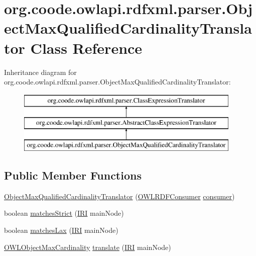 \hypertarget{classorg_1_1coode_1_1owlapi_1_1rdfxml_1_1parser_1_1_object_max_qualified_cardinality_translator}{\section{org.\-coode.\-owlapi.\-rdfxml.\-parser.\-Object\-Max\-Qualified\-Cardinality\-Translator Class Reference}
\label{classorg_1_1coode_1_1owlapi_1_1rdfxml_1_1parser_1_1_object_max_qualified_cardinality_translator}
}
Inheritance diagram for org.\-coode.\-owlapi.\-rdfxml.\-parser.\-Object\-Max\-Qualified\-Cardinality\-Translator\-:\begin{figure}[H]
\begin{center}
\leavevmode
\includegraphics[height=3.000000cm]{classorg_1_1coode_1_1owlapi_1_1rdfxml_1_1parser_1_1_object_max_qualified_cardinality_translator}
\end{center}
\end{figure}
\subsection*{Public Member Functions}
\begin{DoxyCompactItemize}
\item 
\hyperlink{classorg_1_1coode_1_1owlapi_1_1rdfxml_1_1parser_1_1_object_max_qualified_cardinality_translator_a48aa870676d975a3e3956262f1e94ecf}{Object\-Max\-Qualified\-Cardinality\-Translator} (\hyperlink{classorg_1_1coode_1_1owlapi_1_1rdfxml_1_1parser_1_1_o_w_l_r_d_f_consumer}{O\-W\-L\-R\-D\-F\-Consumer} \hyperlink{classorg_1_1coode_1_1owlapi_1_1rdfxml_1_1parser_1_1_abstract_class_expression_translator_ae547084cdd5b92c03835b5aa404f823b}{consumer})
\item 
boolean \hyperlink{classorg_1_1coode_1_1owlapi_1_1rdfxml_1_1parser_1_1_object_max_qualified_cardinality_translator_ad461aae70c653f295608a079ed0530b1}{matches\-Strict} (\hyperlink{classorg_1_1semanticweb_1_1owlapi_1_1model_1_1_i_r_i}{I\-R\-I} main\-Node)
\item 
boolean \hyperlink{classorg_1_1coode_1_1owlapi_1_1rdfxml_1_1parser_1_1_object_max_qualified_cardinality_translator_ab005d68d441c95647ca5c6f4d48e24a9}{matches\-Lax} (\hyperlink{classorg_1_1semanticweb_1_1owlapi_1_1model_1_1_i_r_i}{I\-R\-I} main\-Node)
\item 
\hyperlink{interfaceorg_1_1semanticweb_1_1owlapi_1_1model_1_1_o_w_l_object_max_cardinality}{O\-W\-L\-Object\-Max\-Cardinality} \hyperlink{classorg_1_1coode_1_1owlapi_1_1rdfxml_1_1parser_1_1_object_max_qualified_cardinality_translator_a2c4452d5d1be900b52c73fd61d544218}{translate} (\hyperlink{classorg_1_1semanticweb_1_1owlapi_1_1model_1_1_i_r_i}{I\-R\-I} main\-Node)
\end{DoxyCompactItemize}
